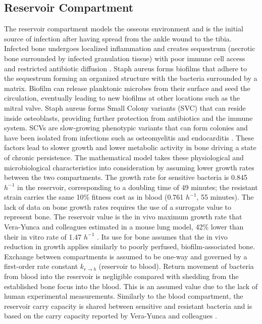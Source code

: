 \documentclass[12pt, draftcls, onecolumn]{IEEEtran}
\begin{document}
\subsection{Reservoir Compartment}
The reservoir compartment models the osseous environment and is the initial source of infection after having spread from the ankle wound to the tibia.
Infected bone undergoes localized inflammation and creates sequestrum (necrotic bone surrounded by infected granulation tissue)
with poor immune cell access and restricted antibiotic diffusion \cite{MomoduSavaliya2023}. Staph aureus forms biofilms that adhere
to the sequestrum forming an organized structure with the bacteria surrounded by a matrix.  Biofilm can release planktonic microbes from their
surface and seed the circulation, eventually leading to new biofilms at other locations such as the mitral valve.
Staph aureus forms Small Colony variants (SVC) that can reside inside osteoblasts, providing further protection
from antibiotics and the immune system\cite{Kahl2016SCV}. SCVs are slow-growing phenotypic variants that can form colonies and have been isolated
from infections such as osteomyelitis and endocarditis \cite{Kahl2016SCV}.  These factors lead to slower growth and lower metabolic activity
in bone driving a state of chronic persistence.  The mathematical model takes these physiological and microbiological characteristics
into consideration by assuming lower growth rates between the two compartments. The growth rate for sensitive bacteria is 0.845 $h^{-1}$ in the
reservoir, corresponding to a doubling time of 49 minutes; the resistant strain carries the same 10\% fitness cost as in blood
(0.761 $h^{-1}$, 55 minutes).  The lack of data on bone growth rates requires the use of a surrogate value to
represent bone.  The reservoir value is the in vivo maximum growth rate that Vera-Yunca and colleagues estimated
in a mouse lung model, 42\% lower than their in vitro rate of 1.47 $h^{-1}$ \cite{VeraYunca2025}. Its use for bone
assumes that the in vivo reduction in growth applies similarly to poorly perfused, biofilm-associated bone.
Exchange between compartments is assumed to be one-way and governed by a first-order rate constant $k_{r \to b}$ (reservoir to blood).
Return movement of bacteria from blood into the reservoir is negligible compared with shedding from the established bone focus into the blood.
This is an assumed value due to the lack of human experimental measurements.  Similarly to the blood compartment, the reservoir carry capacity is shared
between sensitive and resistant bacteria and is based on the carry capacity reported by Vera-Yunca and colleagues \cite{VeraYunca2025}.
\end{document}
